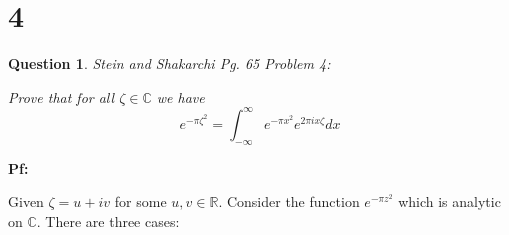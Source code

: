 \documentclass{article}
\newtheorem{question}{Question}
\begin{document}
\break

\section*{4}
\begin{myBox}[]{}
    \begin{question}
        Stein and Shakarchi Pg. 65 Problem 4:

        Prove that for all $\zeta\in \mathbb{C}$ we have 
        $$e^{-\pi \zeta^2}=\int_{-\infty}^{\infty}e^{-\pi x^2}e^{2\pi ix\zeta}dx$$
    \end{question}
\end{myBox}

\textbf{Pf:}

Given $\zeta=u+iv$ for some $u,v\in\mathbb{R}$. Consider the function $e^{-\pi z^2}$ which is analytic on $\mathbb{C}$.
There are three cases:
\end{document}
